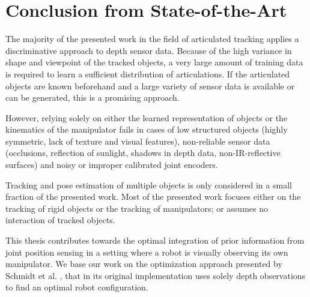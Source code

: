 \section{Conclusion from State-of-the-Art}
\label{sec:discussion}

The majority of the presented work in the field of articulated tracking applies a discriminative approach to depth sensor data. Because of the high variance in shape and viewpoint of the tracked objects, a very large amount of training data is required to learn a sufficient distribution of articulations. If the articulated objects are known beforehand and a large variety of sensor data is available or can be generated, this is a promising approach.

However, relying solely on either the learned representation of objects or the kinematics of the manipulator fails in cases of low structured objects (highly symmetric, lack of texture and visual features), non-reliable sensor data (occlusions, reflection of sunlight, shadows in depth data, non-IR-reflective surfaces) and noisy or improper calibrated joint encoders.

Tracking and pose estimation of multiple objects is only considered in a small fraction of the presented work. Most of the presented work focuses either on the tracking of rigid objects or the tracking of manipulators; or assumes no interaction of tracked objects.

This thesis contributes towards the optimal integration of prior information from joint position sensing in a setting where a robot is visually observing its own manipulator. We base our work on the optimization approach presented by Schmidt et al. \cite{Schmidt2015}, that in its original implementation uses solely depth observations to find an optimal robot configuration.
